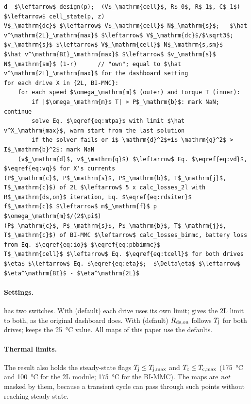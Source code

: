 \begin{lstlisting}[caption={Efficiency maps (\code{model.loss_maps}) at a given SOC $z$.}, label={alg:maps}]
d  $\leftarrow$ design(p);  (V$_\mathrm{cell}$, R$_0$, R$_1$, C$_1$) $\leftarrow$ cell_state(p, z)
V$_\mathrm{dc}$ $\leftarrow$ V$_\mathrm{cell}$ N$_\mathrm{s}$;   $\hat v^\mathrm{2L}_\mathrm{max}$ $\leftarrow$ V$_\mathrm{dc}$/$\sqrt3$;   $v_\mathrm{s}$ $\leftarrow$ V$_\mathrm{cell}$ N$_\mathrm{s,sm}$
$\hat v^\mathrm{BI}_\mathrm{max}$ $\leftarrow$ $v_\mathrm{s}$ N$_\mathrm{sm}$ (1-r)      // "own"; equal to $\hat v^\mathrm{2L}_\mathrm{max}$ for the dashboard setting
for each drive X in {2L, BI-MMC}:
    for each speed $\omega_\mathrm{m}$ (outer) and torque T (inner):
        if |$\omega_\mathrm{m}$ T| > P$_\mathrm{b}$: mark NaN; continue
        solve Eq. $\eqref{eq:mtpa}$ with limit $\hat v^X_\mathrm{max}$, warm start from the last solution
        if the solver fails or i$_\mathrm{d}^2$+i$_\mathrm{q}^2$ > I$_\mathrm{b}^2$: mark NaN
    (v$_\mathrm{d}$, v$_\mathrm{q}$) $\leftarrow$ Eq. $\eqref{eq:vd}$, $\eqref{eq:vq}$ for X's currents
(P$_\mathrm{c}$, P$_\mathrm{s}$, P$_\mathrm{b}$, T$_\mathrm{j}$, T$_\mathrm{c}$) of 2L $\leftarrow$ 5 x calc_losses_2l with R$_\mathrm{ds,on}$ iteration, Eq. $\eqref{eq:rdsiter}$
f$_\mathrm{c}$ $\leftarrow$ m$_\mathrm{f}$ p $\omega_\mathrm{m}$/(2$\pi$)
(P$_\mathrm{c}$, P$_\mathrm{s}$, P$_\mathrm{b}$, T$_\mathrm{j}$, T$_\mathrm{c}$) of BI-MMC $\leftarrow$ calc_losses_bimmc, battery loss from Eq. $\eqref{eq:io}$-$\eqref{eq:pbbimmc}$
T$_\mathrm{cell}$ $\leftarrow$ Eq. $\eqref{eq:tcell}$ for both drives
$\eta$ $\leftarrow$ Eq. $\eqref{eq:eta}$;  $\Delta\eta$ $\leftarrow$ $\eta^\mathrm{BI}$ - $\eta^\mathrm{2L}$
\end{lstlisting}

\paragraph{Settings.}  has two switches. With  (default) each drive uses its own limit;  gives the 2L limit to both, as the original dashboard does. With  (default) $R_\mathrm{ds,on}$ follows $T_\mathrm{j}$ for both drives;  keeps the \SI{25}{\celsius} value. All maps of this paper use the defaults.

\paragraph{Thermal limits.} The result also holds the steady-state flags $T_\mathrm{j}\le T_\mathrm{j,max}$ and $T_\mathrm{c}\le T_\mathrm{c,max}$ (\SI{175}{\celsius} and \SI{100}{\celsius} for the 2L module; \SI{175}{\celsius} for the BI-MMC). The maps are \emph{not} masked by them, because a transient cycle can pass through such points without reaching steady state.

